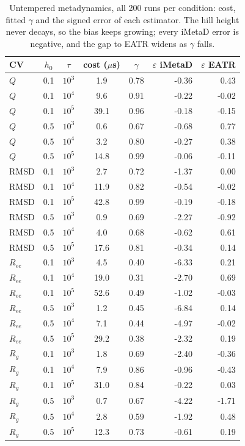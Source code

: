 \begin{table}[H]\centering
\caption{Untempered metadynamics, all 200 runs per condition: cost, fitted $\gamma$ and the signed error of each estimator. The hill height never decays, so the bias keeps growing; every iMetaD error is negative, and the gap to EATR widens as $\gamma$ falls.}\label{tab:s16}
\begin{tabular}{lccccrr}\toprule
CV & $h_0$ & $\tau$ & cost ($\mu$s) & $\gamma$ & $\varepsilon$ iMetaD & $\varepsilon$ EATR\\ \midrule
$Q$ & 0.1 & $10^{3}$ & 1.9 & 0.78 & -0.36 & 0.43 \\
$Q$ & 0.1 & $10^{4}$ & 9.6 & 0.91 & -0.22 & -0.02 \\
$Q$ & 0.1 & $10^{5}$ & 39.1 & 0.96 & -0.18 & -0.15 \\
$Q$ & 0.5 & $10^{3}$ & 0.6 & 0.67 & -0.68 & 0.77 \\
$Q$ & 0.5 & $10^{4}$ & 3.2 & 0.80 & -0.27 & 0.38 \\
$Q$ & 0.5 & $10^{5}$ & 14.8 & 0.99 & -0.06 & -0.11 \\
RMSD & 0.1 & $10^{3}$ & 2.7 & 0.72 & -1.37 & 0.00 \\
RMSD & 0.1 & $10^{4}$ & 11.9 & 0.82 & -0.54 & -0.02 \\
RMSD & 0.1 & $10^{5}$ & 42.8 & 0.99 & -0.19 & -0.18 \\
RMSD & 0.5 & $10^{3}$ & 0.9 & 0.69 & -2.27 & -0.92 \\
RMSD & 0.5 & $10^{4}$ & 4.0 & 0.68 & -0.62 & 0.61 \\
RMSD & 0.5 & $10^{5}$ & 17.6 & 0.81 & -0.34 & 0.14 \\
$R_{ee}$ & 0.1 & $10^{3}$ & 4.5 & 0.40 & -6.33 & 0.21 \\
$R_{ee}$ & 0.1 & $10^{4}$ & 19.0 & 0.31 & -2.70 & 0.69 \\
$R_{ee}$ & 0.1 & $10^{5}$ & 52.6 & 0.49 & -1.02 & -0.03 \\
$R_{ee}$ & 0.5 & $10^{3}$ & 1.2 & 0.45 & -6.84 & 0.14 \\
$R_{ee}$ & 0.5 & $10^{4}$ & 7.1 & 0.44 & -4.97 & -0.02 \\
$R_{ee}$ & 0.5 & $10^{5}$ & 29.2 & 0.38 & -2.32 & 0.19 \\
$R_g$ & 0.1 & $10^{3}$ & 1.8 & 0.69 & -2.40 & -0.36 \\
$R_g$ & 0.1 & $10^{4}$ & 7.9 & 0.86 & -0.96 & -0.43 \\
$R_g$ & 0.1 & $10^{5}$ & 31.0 & 0.84 & -0.22 & 0.03 \\
$R_g$ & 0.5 & $10^{3}$ & 0.7 & 0.67 & -4.22 & -1.71 \\
$R_g$ & 0.5 & $10^{4}$ & 2.8 & 0.59 & -1.92 & 0.48 \\
$R_g$ & 0.5 & $10^{5}$ & 12.3 & 0.73 & -0.61 & 0.19\\ \bottomrule
\end{tabular}
\end{table}
